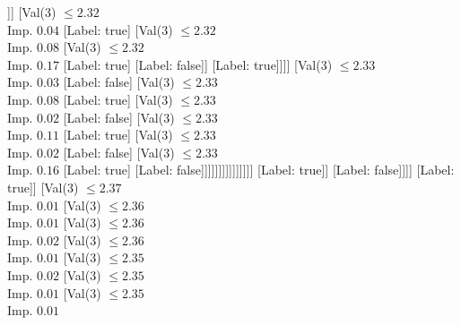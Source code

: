 \documentclass[margin=10pt]{standalone}
\begin{document}
\begin{forest}
																									[Val($3$) $ \leq 2.32$ \\ Imp. $0.13$
																										[Val($3$) $ \leq 2.32$ \\ Imp. $0.06$
																											[Label: false]
																											[Val($3$) $ \leq 2.32$ \\ Imp. $0.44$
																												[Label: true]
																												[Label: false]]]
																										[Val($3$) $ \leq 2.32$ \\ Imp. $0.04$
																											[Label: true]
																											[Val($3$) $ \leq 2.32$ \\ Imp. $0.08$
																												[Val($3$) $ \leq 2.32$ \\ Imp. $0.17$
																													[Label: true]
																													[Label: false]]
																												[Label: true]]]]
																									[Val($3$) $ \leq 2.33$ \\ Imp. $0.03$
																										[Label: false]
																										[Val($3$) $ \leq 2.33$ \\ Imp. $0.08$
																											[Label: true]
																											[Val($3$) $ \leq 2.33$ \\ Imp. $0.02$
																												[Label: false]
																												[Val($3$) $ \leq 2.33$ \\ Imp. $0.11$
																													[Label: true]
																													[Val($3$) $ \leq 2.33$ \\ Imp. $0.02$
																														[Label: false]
																														[Val($3$) $ \leq 2.33$ \\ Imp. $0.16$
																															[Label: true]
																															[Label: false]]]]]]]]]]]]]]]
																	[Label: true]]
																[Label: false]]]]
													[Label: true]]
												[Val($3$) $ \leq 2.37$ \\ Imp. $0.01$
													[Val($3$) $ \leq 2.36$ \\ Imp. $0.01$
														[Val($3$) $ \leq 2.36$ \\ Imp. $0.02$
															[Val($3$) $ \leq 2.36$ \\ Imp. $0.01$
																[Val($3$) $ \leq 2.35$ \\ Imp. $0.02$
																	[Val($3$) $ \leq 2.35$ \\ Imp. $0.01$
																		[Val($3$) $ \leq 2.35$ \\ Imp. $0.01$

\end{forest}
\end{document}
